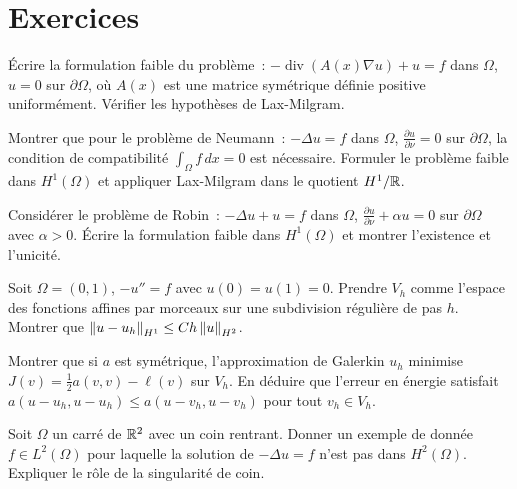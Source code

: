 \section{Exercices}

\begin{exercice}
\'Ecrire la formulation faible du probl\`eme~:
$-\operatorname{div}(A(x)\nabla u) + u = f$ dans $\Omega$, $u = 0$ sur $\partial\Omega$,
o\`u $A(x)$ est une matrice sym\'etrique d\'efinie positive uniform\'ement.
V\'erifier les hypoth\`eses de Lax-Milgram.
\end{exercice}

\begin{exercice}
Montrer que pour le probl\`eme de Neumann~:
$-\Delta u = f$ dans $\Omega$, $\frac{\partial u}{\partial \nu} = 0$ sur
$\partial\Omega$, la condition de compatibilit\'e $\int_\Omega f\, dx = 0$ est
n\'ecessaire. Formuler le probl\`eme faible dans $H^1(\Omega)$ et appliquer
Lax-Milgram dans le quotient $H^1/\mathbb{R}$.
\end{exercice}

\begin{exercice}
Consid\'erer le probl\`eme de Robin~: $-\Delta u + u = f$ dans $\Omega$,
$\frac{\partial u}{\partial \nu} + \alpha u = 0$ sur $\partial\Omega$ avec
$\alpha > 0$. \'Ecrire la formulation faible dans $H^1(\Omega)$ et montrer
l'existence et l'unicit\'e.
\end{exercice}

\begin{exercice}
Soit $\Omega = (0,1)$, $-u'' = f$ avec $u(0) = u(1) = 0$. Prendre $V_h$ comme
l'espace des fonctions affines par morceaux sur une subdivision r\'eguli\`ere de pas $h$.
Montrer que $\left\| u - u_h \right\|_{H^1} \leq C h \left\| u \right\|_{H^2}$.
\end{exercice}

\begin{exercice}
Montrer que si $a$ est sym\'etrique, l'approximation de Galerkin $u_h$ minimise
$J(v) = \frac{1}{2}a(v,v) - \ell(v)$ sur $V_h$. En d\'eduire que l'erreur en
\'energie satisfait $a(u - u_h, u - u_h) \leq a(u - v_h, u - v_h)$ pour tout
$v_h \in V_h$.
\end{exercice}

\begin{exercice}
Soit $\Omega$ un carr\'e de $\mathbb{R}^2$ avec un coin rentrant. Donner un exemple de
donn\'ee $f \in L^2(\Omega)$ pour laquelle la solution de $-\Delta u = f$ n'est
pas dans $H^2(\Omega)$. Expliquer le r\^ole de la singularit\'e de coin.
\end{exercice}
